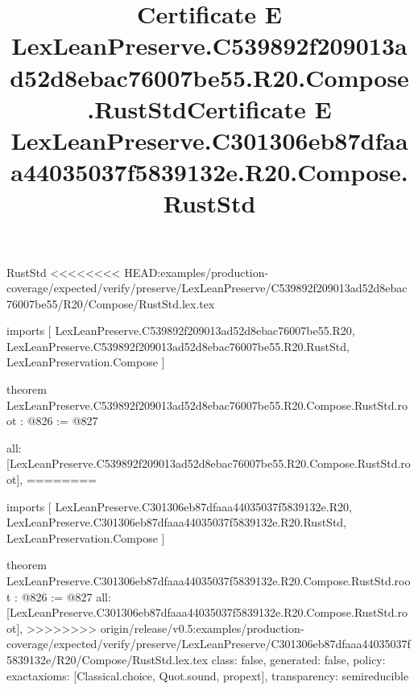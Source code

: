 \begin{lexlean}{RustStd}
<<<<<<<< HEAD:examples/production-coverage/expected/verify/preserve/LexLeanPreserve/C539892f209013ad52d8ebac76007be55/R20/Compose/RustStd.lex.tex
\title{Certificate E LexLeanPreserve.C539892f209013ad52d8ebac76007be55.R20.Compose.RustStd}
\begin{coremodule}
imports [
  LexLeanPreserve.C539892f209013ad52d8ebac76007be55.R20,
  LexLeanPreserve.C539892f209013ad52d8ebac76007be55.R20.RustStd,
  LexLeanPreservation.Compose
]

theorem LexLeanPreserve.C539892f209013ad52d8ebac76007be55.R20.Compose.RustStd.root : @826 := @827 {
  all: [LexLeanPreserve.C539892f209013ad52d8ebac76007be55.R20.Compose.RustStd.root],
========
\title{Certificate E LexLeanPreserve.C301306eb87dfaaa44035037f5839132e.R20.Compose.RustStd}
\begin{coremodule}
imports [
  LexLeanPreserve.C301306eb87dfaaa44035037f5839132e.R20,
  LexLeanPreserve.C301306eb87dfaaa44035037f5839132e.R20.RustStd,
  LexLeanPreservation.Compose
]

theorem LexLeanPreserve.C301306eb87dfaaa44035037f5839132e.R20.Compose.RustStd.root : @826 := @827 {
  all: [LexLeanPreserve.C301306eb87dfaaa44035037f5839132e.R20.Compose.RustStd.root],
>>>>>>>> origin/release/v0.5:examples/production-coverage/expected/verify/preserve/LexLeanPreserve/C301306eb87dfaaa44035037f5839132e/R20/Compose/RustStd.lex.tex
  class: false,
  generated: false,
  policy: exact{axioms: [Classical.choice, Quot.sound, propext]},
  transparency: semireducible
}


\end{coremodule}}
\end{coremodule}
\end{lexlean}
